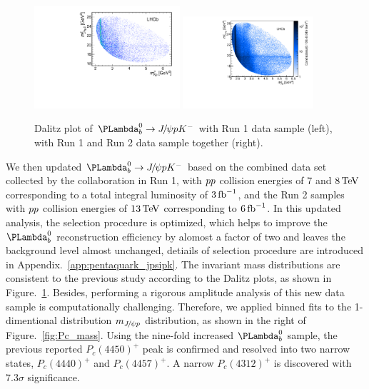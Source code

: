 \begin{figure}[!hbtp]
\centering
   \includegraphics[width=0.48\textwidth]{Figures/01_Introduction/Exotic/Pc_states/2015-lhcb-Lb2jpsipK-dalitz} %
   \includegraphics[width=0.43\textwidth]{Figures/01_Introduction/Exotic/Pc_states/2019-Dalitz_plot_pc} %
   \caption{ 
   Dalitz plot of $\Lb\to\jpsi\proton\Km$ with Run 1 data sample (left)\supercite{LHCb-PAPER-2015-029}, 
   with Run 1 and Run 2 data sample together (right)\supercite{LHCb-PAPER-2019-014}.}
\label{fig:Pc_dalitz}
\end{figure}

We then updated $\Lb\to\jpsi\proton\Km$ based on the combined data set collected by the \lhcb collaboration in Run 1,
with ${p}{p}$ collision energies of $7$ and $8 \text{\,Te\kern -0.1em V}$ corresponding to a total integral luminosity of $3 \text{\,fb}^{-1}$,
and the Run 2 samples with ${p}{p}$ collision energies of $13 \text{\,Te\kern -0.1em V}$ corresponding to $6 \text{\,fb}^{-1}$\supercite{LHCb-PAPER-2019-014}.
In this updated analysis,
the selection procedure is optimized,
which helps to improve the $\Lb$ reconstruction efficiency  by alomost a factor of two 
and leaves the background level almost unchanged,
detiails of selection procedure are introduced in Appendix.~\ref{app:pentaquark_jpsipk}.
The invariant mass distributions are consistent to the previous study according to the Dalitz plots,
as shown in Figure.~\ref{fig:Pc_dalitz}.
Besides,
performing a rigorous amplitude analysis of this new data sample is computationally challenging.
Therefore,
we applied binned fits to the 1-dimentional distribution $m_{{{J\mskip -3mu/\mskip -2mu\psi}}{p}}$ distribution,
as shown in the right of Figure.~\ref{fig:Pc_mass}.
Using the nine-fold increased $\Lb$ sample,
the previous reported $P_{c}(4450)^+$ peak is confirmed and resolved into two narrow states,
$P_{c}(4440)^+$ and $P_{c}(4457)^+$.
A narrow $P_{c}(4312)^+$ is discovered with $7.3\sigma$ significance.

